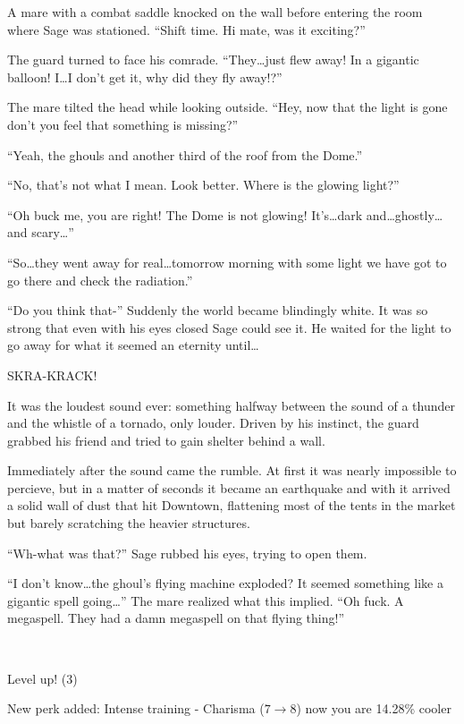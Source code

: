 A mare with a combat saddle knocked on the wall before entering the room where Sage was stationed. ``Shift time. Hi mate, was it exciting?''

The guard turned to face his comrade. ``They\dots just flew away! In a gigantic balloon! I\dots I don't get it, why did they fly away!?''

The mare tilted the head while looking outside. ``Hey, now that the light is gone don't you feel that something is missing?''

``Yeah, the ghouls and another third of the roof from the Dome.''

``No, that's not what I mean. Look better. Where is the glowing light?''

``Oh buck me, you are right! The Dome is not glowing! It's\dots dark and\dots ghostly\dots and scary\dots''

``So\dots they went away for real\dots tomorrow morning with some light we have got to go there and check the radiation.''

``Do you think that-'' Suddenly the world became blindingly white. It was so strong that even with his eyes closed Sage could see it. He waited for the light to go away for what it seemed an eternity until\dots

SKRA-KRACK!

It was the loudest sound ever: something halfway between the sound of a thunder and the whistle of a tornado, only louder. Driven by his instinct, the guard grabbed his friend and tried to gain shelter behind a wall.

Immediately after the sound came the rumble. At first it was nearly impossible to percieve, but in a matter of seconds it became an earthquake and with it arrived a solid wall of dust that hit Downtown, flattening most of the tents in the market but barely scratching the heavier structures.

``Wh-what was that?'' Sage rubbed his eyes, trying to open them.

``I don't know\dots the ghoul's flying machine exploded? It seemed something like a gigantic spell going\dots'' The mare realized what this implied. ``Oh fuck. A megaspell. They had a damn megaspell on that flying thing!''

~\vfill

\begin{note}
    Level up! (3)
    
    New perk added: Intense training - Charisma ($7 \to 8$) now you are 14.28\% cooler
\end{note}




